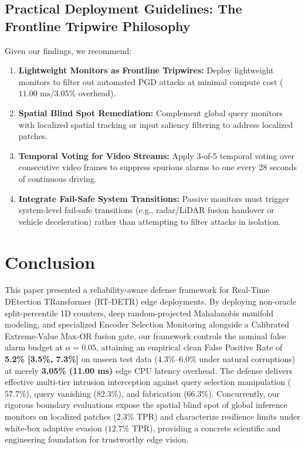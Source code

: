 \documentclass[preprint,12pt]{elsarticle}
\begin{document}
\subsection{Practical Deployment Guidelines: The Frontline Tripwire Philosophy}
Given our findings, we recommend:
\begin{enumerate}
    \item \textbf{Lightweight Monitors as Frontline Tripwires:} Deploy lightweight monitors to filter out automated PGD attacks at minimal compute cost ($11.00\text{ ms} / 3.05\%$ overhead).
    \item \textbf{Spatial Blind Spot Remediation:} Complement global query monitors with localized spatial tracking or input saliency filtering to address localized patches.
    \item \textbf{Temporal Voting for Video Streams:} Apply 3-of-5 temporal voting over consecutive video frames to suppress spurious alarms to one every 28 seconds of continuous driving.
    \item \textbf{Integrate Fail-Safe System Transitions:} Passive monitors must trigger system-level fail-safe transitions (e.g., radar/LiDAR fusion handover or vehicle deceleration) rather than attempting to filter attacks in isolation.
\end{enumerate}

\section{Conclusion}
\label{sec:conclusion}

This paper presented a reliability-aware defense framework for Real-Time DEtection TRansformer (RT-DETR) edge deployments. By deploying non-oracle split-percentile 1D counters, deep random-projected Mahalanobis manifold modeling, and specialized Encoder Selection Monitoring alongside a Calibrated Extreme-Value Max-OR fusion gate, our framework controls the nominal false alarm budget at $\alpha=0.05$, attaining an empirical clean False Positive Rate of \textbf{5.2\% [3.5\%, 7.3\%]} on unseen test data ($4.3\%$--$6.0\%$ under natural corruptions) at merely \textbf{3.05\% (11.00 ms)} edge CPU latency overhead. The defense delivers effective multi-tier intrusion interception against query selection manipulation ($57.7\%$), query vanishing ($82.3\%$), and fabrication ($66.3\%$). Concurrently, our rigorous boundary evaluations expose the spatial blind spot of global inference monitors on localized patches ($2.3\%$ TPR) and characterize resilience limits under white-box adaptive evasion ($12.7\%$ TPR), providing a concrete scientific and engineering foundation for trustworthy edge vision.
\end{document}
